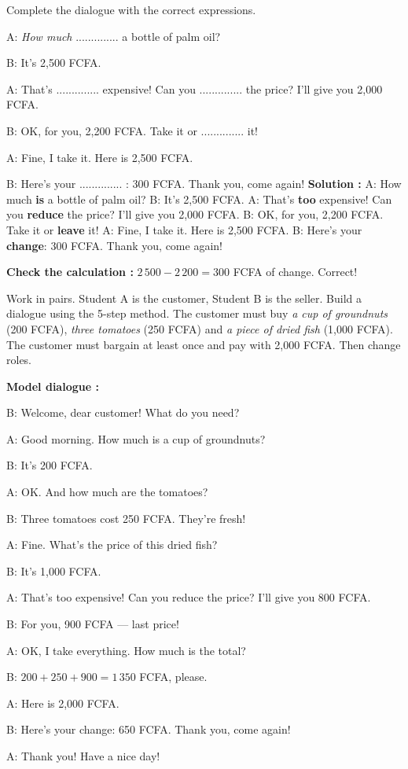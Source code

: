 \documentclass[11pt]{article}
\begin{document}
\begin{exoresolu}
Complete the dialogue with the correct expressions.\par
A: \emph{How much} .............. a bottle of palm oil?\par
B: It's 2,500 FCFA.\par
A: That's .............. expensive! Can you .............. the price? I'll give you 2,000 FCFA.\par
B: OK, for you, 2,200 FCFA. Take it or .............. it!\par
A: Fine, I take it. Here is 2,500 FCFA.\par
B: Here's your .............. : 300 FCFA. Thank you, come again!
\tcblower
\textbf{Solution :} A: How much \textbf{is} a bottle of palm oil? B: It's 2,500 FCFA. A: That's \textbf{too} expensive! Can you \textbf{reduce} the price? I'll give you 2,000 FCFA. B: OK, for you, 2,200 FCFA. Take it or \textbf{leave} it! A: Fine, I take it. Here is 2,500 FCFA. B: Here's your \textbf{change}: 300 FCFA. Thank you, come again!\par
\textbf{Check the calculation :} $2\,500 - 2\,200 = 300$ FCFA of change. Correct!
\end{exoresolu}

\begin{exercice}
Work in pairs. Student A is the customer, Student B is the seller. Build a dialogue using the 5-step method. The customer must buy \emph{a cup of groundnuts} (200 FCFA), \emph{three tomatoes} (250 FCFA) and \emph{a piece of dried fish} (1,000 FCFA). The customer must bargain at least once and pay with 2,000 FCFA. Then change roles.
\end{exercice}

\begin{corrige}
\textbf{Model dialogue :}\par
B: Welcome, dear customer! What do you need?\par
A: Good morning. How much is a cup of groundnuts?\par
B: It's 200 FCFA.\par
A: OK. And how much are the tomatoes?\par
B: Three tomatoes cost 250 FCFA. They're fresh!\par
A: Fine. What's the price of this dried fish?\par
B: It's 1,000 FCFA.\par
A: That's too expensive! Can you reduce the price? I'll give you 800 FCFA.\par
B: For you, 900 FCFA — last price!\par
A: OK, I take everything. How much is the total?\par
B: $200 + 250 + 900 = 1\,350$ FCFA, please.\par
A: Here is 2,000 FCFA.\par
B: Here's your change: 650 FCFA. Thank you, come again!\par
A: Thank you! Have a nice day!
\end{corrige}
\end{document}
